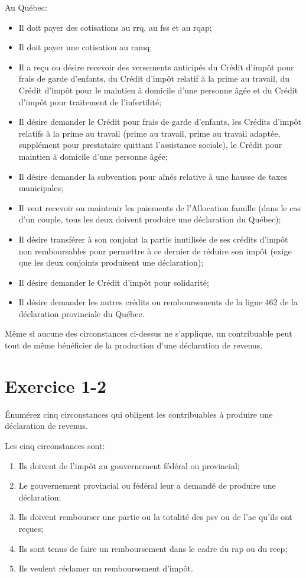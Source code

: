 Au Québec:
\qc
\begin{itemize}
	\item Il doit payer des cotisations au \acrfull{rrq}, au \acrfull{fss} et au \acrfull{rqap};
	\item Il doit payer une cotisation au \acrfull{ramq};
	\item Il a reçu ou désire recevoir des versements anticipés du Crédit d'impôt pour frais de garde d'enfants, du Crédit d'impôt relatif à la prime au travail, du Crédit d'impôt pour le maintien à domicile d'une personne âgée et du Crédit d'impôt pour traitement de l'infertilité;
	\item Il désire demander le Crédit pour frais de garde d'enfants, les Crédits d'impôt relatifs à la prime au travail (prime au travail, prime au travail adaptée, supplément pour prestataire quittant l'assistance sociale), le Crédit pour maintien à domicile d'une personne âgée;
	\item Il désire demander la subvention pour aînés relative à une hausse de taxes municipales;
	\item Il veut recevoir ou maintenir les paiements de l'Allocation famille (dans le cas d'un couple, tous les deux doivent produire une déclaration du Québec);
	\item Il désire transférer à son conjoint la partie inutilisée de ses crédits d'impôt non remboursables pour permettre à ce dernier de réduire son impôt (exige que les deux conjoints produisent une déclaration);
	\item Il désire demander le Crédit d'impôt pour solidarité;
	\item Il désire demander les autres crédits ou remboursements de la ligne 462 de la déclaration provinciale du Québec.
\end{itemize}

Même si aucune des circonstances ci-dessus ne s'applique, un contribuable peut tout de même bénéficier de la production d'une déclaration de revenus.



\section{Exercice 1-2}
\setcounter{question}{0}
\begin{question}
	Énumérez cinq circonstances qui obligent les contribuables à produire une déclaration de revenus.
\end{question}
Les cinq circonstances sont:
\begin{enumerate}
	\item Ils doivent de l'impôt au gouvernement fédéral ou provincial;
	\item Le gouvernement provincial ou fédéral leur a demandé de produire une déclaration;
	\item Ils doivent rembourser une partie ou la totalité des \acrfull{psv} ou de l'\acrfull{ae} qu'ils ont reçues;
	\item Ils sont tenus de faire un remboursement dans le cadre du \acrfull{rap} ou du \acrfull{reep};
	\item Ils veulent réclamer un remboursement d'impôt.
\end{enumerate}

